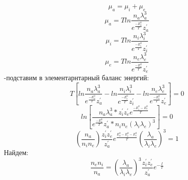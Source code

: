 \documentclass[letterpaper,12pt]{article}
\begin{document}
\begin{equation} \label{eq:aperp} %
\mu_{a}=\mu_{i} + \mu_{e} 
\end{equation}
\begin{equation} \label{eq:aperp} %
\mu_{a}=Tln{\frac{n_a \lambda_{a}^{3}}{e^{\frac{-E_{a}^{0}}{T}}z_{a}^{'}}} 
\end{equation}
\begin{equation} \label{eq:aperp} %
\mu_{i}=Tln{\frac{n_i \lambda_{i}^{3}}{e^{\frac{-E_{i}^{0}}{T}}z_{i}^{'}}}
\end{equation}
\begin{equation} \label{eq:aperp} %
\mu_{e}=Tln{\frac{n_e \lambda_{e}^{3}}{e^{\frac{-E_{e}^{0}}{T}}z_{e}^{'}}}
\end{equation}
-подставим в элементарнтарный баланс энергий:
\begin{equation} \label{eq:aperp} %
T[ln{\frac{n_a \lambda_{a}^{3}}{e^{\frac{-E_{a}^{0}}{T}}z_{a}^{'}}- ln{\frac{n_i \lambda_{i}^{3}}{e^{\frac{-E_{i}^{0}}{T}}z_{i}^{'}}}} - ln{\frac{n_e \lambda_{e}^{3}}{e^{\frac{-E_{e}^{0}}{T}}z_{e}^{'}}} ]=0 
\end{equation}
\begin{equation} \label{eq:aperp} %
ln[\frac{n_a \lambda_{a}^{3}* {z}_{i}^{'}{z}_{e}^{'}e^{\frac{-E_{i}^{0}-E_{e}^{0}}{T}}}{e^{\frac{-E_{a}^{0}}{T}}z_{a}^{'}* n_i n_e(\lambda_i \lambda_e)^3}]=0 
\end{equation}
\begin{equation} \label{eq:aperp} %
(\frac{n_a}{n_i n_e}) \frac{z_{i}^{'}z_{e}^{'}}{z_{a}^{'}}e^\frac{E_{a}^{0}-E_{i}^{0}-E_{e}^{0}}{T}(\frac{\lambda_a}{\lambda_i \lambda_e})^3=1 
\end{equation}
Найдем:
\begin{equation} \label{eq:aperp} %
\frac{n_e n_i}{n_a}=(\frac{\lambda_a}{\lambda_i \lambda_e})^3\frac{z_{i}^{'}z_{e}^{'}}{z_{a}^{'}}e^{-\frac{I}{T}} 
\end{equation}
\end{document}
